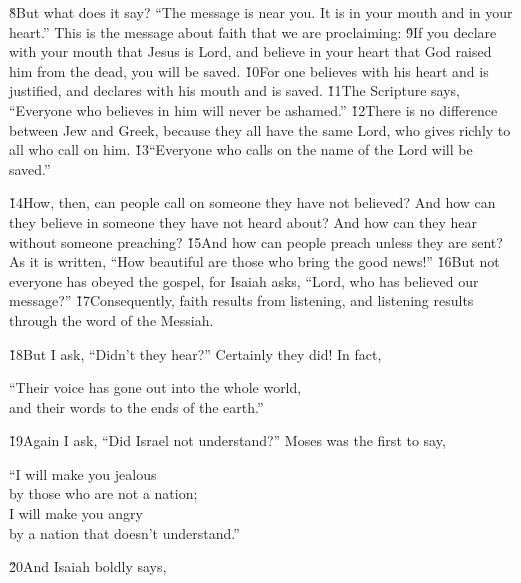 \v{8}But what does it say? ``The message is near you. It is in your mouth and in your heart.'' This is the message about faith that we are proclaiming: \v{9}If you declare with your mouth that Jesus is Lord, and believe in your heart that God raised him from the dead, you will be saved. \v{10}For one believes with his heart and is justified, and declares with his mouth and is saved. \v{11}The Scripture says, ``Everyone who believes in him will never be ashamed.'' \v{12}There is no difference between Jew and Greek, because they all have the same Lord, who gives richly to all who call on him. \v{13}``Everyone who calls on the name of the Lord will be saved.''

\v{14}How, then, can people call on someone they have not believed? And how can they believe in someone they have not heard about? And how can they hear without someone preaching? \v{15}And how can people preach unless they are sent? As it is written, ``How beautiful are those who bring the good news!'' \v{16}But not everyone has obeyed the gospel, for Isaiah asks, ``Lord, who has believed our message?'' \v{17}Consequently, faith results from listening, and listening results through the word of the Messiah.

\v{18}But I ask, ``Didn't they hear?'' Certainly they did! In fact,

\begin{poetry}
\poeml ``Their voice has gone out into the whole world, \\
\poemll    and their words to the ends of the earth.''
\end{poetry}

\v{19}Again I ask, ``Did Israel not understand?'' Moses was the first to say,

\begin{poetry}
\poeml ``I will make you jealous \\
\poemll    by those who are not a nation; \\
\poeml I will make you angry \\
\poemll    by a nation that doesn't understand.''
\end{poetry}

\v{20}And Isaiah boldly says,

